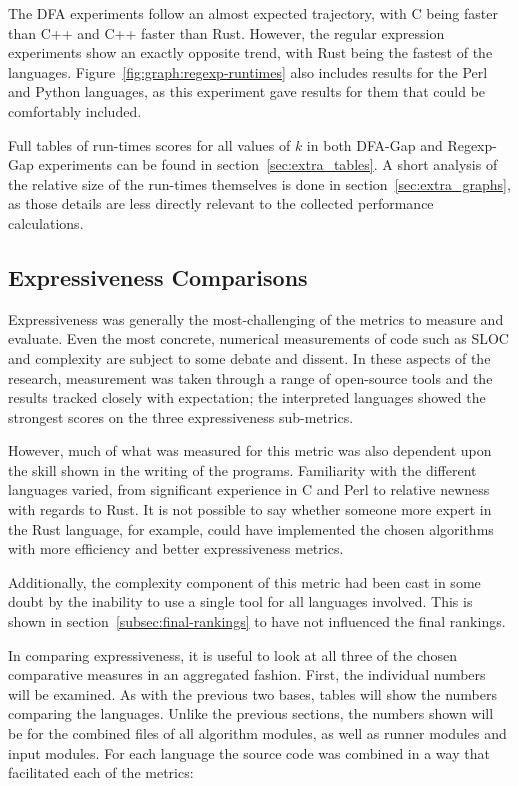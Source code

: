 The DFA experiments follow an almost expected trajectory, with C being faster than C++ and C++ faster than Rust. However, the regular expression experiments show an exactly opposite trend, with Rust being the fastest of the languages. Figure~\ref{fig:graph:regexp-runtimes} also includes results for the Perl and Python languages, as this experiment gave results for them that could be comfortably included.

Full tables of run-times scores for all values of $k$ in both DFA-Gap and Regexp-Gap experiments can be found in section~\ref{sec:extra_tables}. A short analysis of the relative size of the run-times themselves is done in section~\ref{sec:extra_graphs}, as those details are less directly relevant to the collected performance calculations.

\subsection{Expressiveness Comparisons}
\label{subsec:expr_comp}

Expressiveness was generally the most-challenging of the metrics to measure and evaluate. Even the most concrete, numerical measurements of code such as SLOC and complexity are subject to some debate and dissent. In these aspects of the research, measurement was taken through a range of open-source tools and the results tracked closely with expectation; the interpreted languages showed the strongest scores on the three expressiveness sub-metrics.

However, much of what was measured for this metric was also dependent upon the skill shown in the writing of the programs. Familiarity with the different languages varied, from significant experience in C and Perl to relative newness with regards to Rust. It is not possible to say whether someone more expert in the Rust language, for example, could have implemented the chosen algorithms with more efficiency and better expressiveness metrics.

Additionally, the complexity component of this metric had been cast in some doubt by the inability to use a single tool for all languages involved. This is shown in section~\ref{subsec:final-rankings} to have not influenced the final rankings.

In comparing expressiveness, it is useful to look at all three of the chosen comparative measures in an aggregated fashion. First, the individual numbers will be examined. As with the previous two bases, tables will show the numbers comparing the languages. Unlike the previous sections, the numbers shown will be for the combined files of all algorithm modules, as well as runner modules and input modules. For each language the source code was combined in a way that facilitated each of the metrics:


